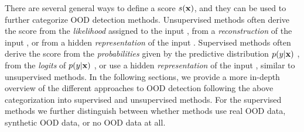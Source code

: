 There are several general ways to define a score $s({\mathbf{x}})$, and they can be used to further categorize OOD detection methods. 
Unsupervised methods often derive the score 
from the \emph{likelihood} assigned to the input \parencite{bishop_novelty_1994,choi_waic_2019,kirichenko_why_2020,ren_likelihood_2019,serra_input_2020,xiao_likelihood_2020,morningstar_density_2021,nalisnick_detecting_2019,bergamin_modelagnostic_2022,maaloe_biva_2019,havtorn_hierarchical_2021}, 
from a \emph{reconstruction} of the input \parencite{sakurada_anomaly_2014,xia_learning_2015,lyudchik_outlier_2016,zhou_anomaly_2017,chen_outlier_2017,schlegl_unsupervised_2017,zong_deep_2018,li_madgan_2019,graham_denoising_2023,liu_unsupervised_2023a}, or 
from a hidden \emph{representation} of the input \parencite{denouden_improving_2018,hendrycks_using_2019,ahmadian_likelihoodfree_2021,bergman_classificationbased_2020,tack_csi_2020,sehwag_ssd_2021,xiao_we_2021}.  %
Supervised methods often derive the score 
from the \emph{probabilities} given by the predictive distribution $p(y|{\mathbf{x}})$ \parencite{hendrycks_baseline_2017,hendrycks_scaling_2022}, 
from the \emph{logits} of $p(y|{\mathbf{x}})$ \parencite{hendrycks_scaling_2022,liu_energybased_2020}, or 
use a hidden \emph{representation} of the input \parencite{lee_simple_2018,li_anomaly_2019,ndiour_outofdistribution_2020,cook_outlier_2020,zaeemzadeh_outofdistribution_2021}, similar to unsupervised methods. 
In the following sections, we provide a more in-depth overview of the different approaches to OOD detection following the above categorization into supervised and unsupervised methods. For the supervised methods we further distinguish between whether methods use real OOD data, synthetic OOD data, or no OOD data at all. 

